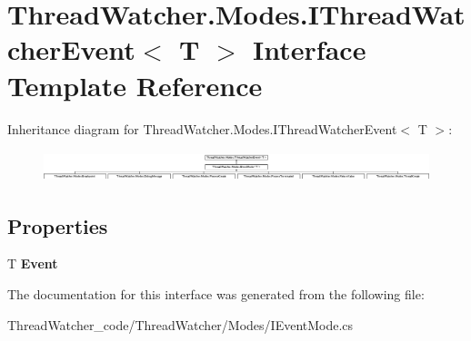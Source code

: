 \hypertarget{interface_thread_watcher_1_1_modes_1_1_i_thread_watcher_event_3_01_t_01_4}{\section{Thread\+Watcher.\+Modes.\+I\+Thread\+Watcher\+Event$<$ T $>$ Interface Template Reference}
\label{interface_thread_watcher_1_1_modes_1_1_i_thread_watcher_event_3_01_t_01_4}
}
Inheritance diagram for Thread\+Watcher.\+Modes.\+I\+Thread\+Watcher\+Event$<$ T $>$\+:\begin{figure}[H]
\begin{center}
\leavevmode
\includegraphics[height=0.915033cm]{interface_thread_watcher_1_1_modes_1_1_i_thread_watcher_event_3_01_t_01_4}
\end{center}
\end{figure}
\subsection*{Properties}
\begin{DoxyCompactItemize}
\item 
\hypertarget{interface_thread_watcher_1_1_modes_1_1_i_thread_watcher_event_3_01_t_01_4_a1c37f283da97ef6a16c2d3d21aed1552}{T {\bfseries Event}}\label{interface_thread_watcher_1_1_modes_1_1_i_thread_watcher_event_3_01_t_01_4_a1c37f283da97ef6a16c2d3d21aed1552}

\end{DoxyCompactItemize}


The documentation for this interface was generated from the following file\+:\begin{DoxyCompactItemize}
\item 
Thread\+Watcher\+\_\+code/\+Thread\+Watcher/\+Modes/I\+Event\+Mode.\+cs\end{DoxyCompactItemize}
